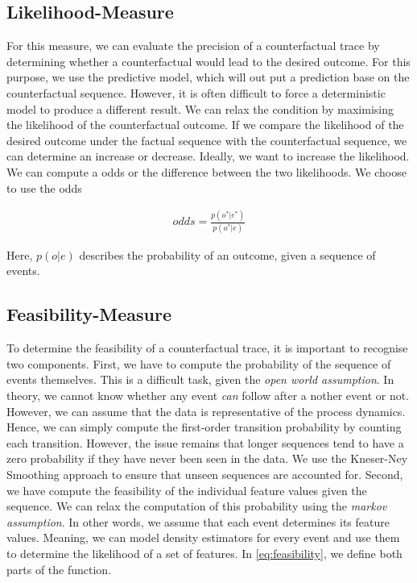 \documentclass[./../../paper.tex]{subfiles}
\begin{document}
\subsection{Likelihood-Measure}
For this measure, we can evaluate the precision of a counterfactual trace by determining whether a counterfactual would lead to the desired outcome. For this purpose, we use the predictive model, which will out put a prediction base on the counterfactual sequence. However, it is often difficult to force a deterministic model to produce a different result. We can relax the condition by maximising the likelihood of the counterfactual outcome. If we compare the likelihood of the desired outcome under the factual sequence with the counterfactual sequence, we can determine an increase or decrease. Ideally, we want to increase the likelihood. We can compute a odds or the difference between the two likelihoods. We choose to use the odds

\begin{align}
    \label{eq:likelihood}
    odds = \frac{p(o^*|e^*)}{p(o^*|e)}
\end{align}

Here, $p(o|e)$ describes the probability of an outcome, given a sequence of events.

\subsection{Feasibility-Measure}
To determine the feasibility of a counterfactual trace, it is important to recognise two components. First, we have to compute the probability of the sequence of events themselves. This is a difficult task, given the \emph{open world assumption}. In theory, we cannot know whether any event \emph{can} follow after a nother event or not. However, we can assume that the data is representative of the process dynamics. Hence, we can simply compute the first-order transition probability by counting each transition. However, the issue remains that longer sequences tend to have a zero probability if they have never been seen in the data. We use the Kneser-Ney Smoothing\autocite{chen_empiricalstudysmoothing_1999} approach to ensure that unseen sequences are accounted for.
Second, we have compute the feasibility of the individual feature values given the sequence. We can relax the computation of this probability using the \emph{markov assumption}. In other words, we assume that each event determines its feature values. Meaning, we can model density estimators for every event and use them to determine the likelihood of a set of features. In \autoref{eq:feasibility}, we define both parts of the function.
\end{document}
